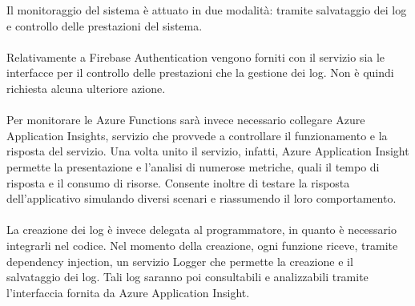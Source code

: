 Il monitoraggio del sistema è attuato in due modalità: tramite salvataggio dei log e controllo delle prestazioni del sistema.\\
\\

Relativamente a Firebase Authentication vengono forniti con il servizio sia le interfacce
per il controllo delle prestazioni che la gestione dei log. Non è quindi richiesta alcuna ulteriore azione.\\
\\
Per monitorare le Azure Functions sarà invece necessario collegare Azure Application Insights, servizio che provvede a controllare il funzionamento e la risposta del servizio. 
Una volta unito il servizio, infatti, Azure Application Insight permette la presentazione e l'analisi di numerose metriche, quali il tempo di risposta e il consumo di risorse. 
Consente inoltre di testare la risposta dell’applicativo simulando diversi scenari e riassumendo il loro comportamento.\\
\\
La creazione dei log è invece delegata al programmatore, in quanto è necessario integrarli nel codice. 
Nel momento della creazione, ogni funzione riceve, tramite dependency injection, un servizio Logger che permette la creazione e il salvataggio dei log. 
Tali log saranno poi consultabili e analizzabili tramite l’interfaccia fornita da Azure Application Insight.\\
\\
\clearpage